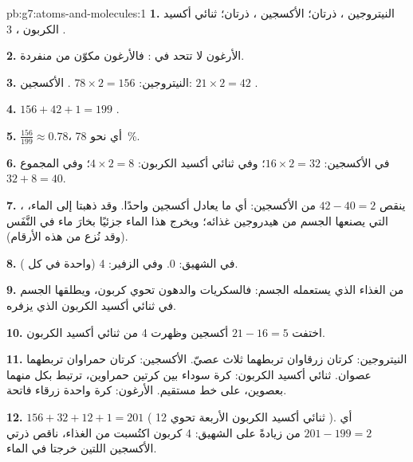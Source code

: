 \begin{solution}{pb:g7:atoms-and-molecules:1}
\textbf{1.} النيتروجين ، ذرتان؛ الأكسجين ، ذرتان؛ ثنائي
أكسيد الكربون ، 3 .

\textbf{2.}  الأرغون لا تتحد في : فالأرغون مكوّن من 
منفردة.

\textbf{3.} النيتروجين: $78 \times 2 = 156$ . الأكسجين: $21\times 2 =
42$ .

\textbf{4.} $156 + 42 + 1 = 199$ .

\textbf{5.} $\frac{156}{199} \approx 0.78$، أي نحو \qty{78}{\percent}.

\textbf{6.} في  الأكسجين: $16\times 2 = 32$؛ وفي  ثنائي أكسيد
الكربون: $4 \times 2 = 8$؛ وفي المجموع $32 + 8 = 40$.

\textbf{7.} ينقص $42 - 40 = 2$ من  الأكسجين: أي ما يعادل  أكسجين
واحدًا. وقد ذهبتا إلى  الماء، ، التي يصنعها الجسم من
هيدروجين غذائه؛ ويخرج هذا الماء جزئيًا بخارَ ماء في النَّفَس (وقد نُزع من
هذه الأرقام).

\textbf{8.} في الشهيق: 0. وفي الزفير: 4 (واحدة في كل ).

\textbf{9.} من الغذاء الذي يستعمله الجسم: فالسكريات والدهون تحوي 
كربون، ويطلقها الجسم في ثنائي أكسيد الكربون الذي يزفره.

\textbf{10.} اختفت $21 - 16 = 5$  أكسجين وظهرت 4  من ثنائي
أكسيد الكربون.

\textbf{11.} النيتروجين: كرتان زرقاوان تربطهما ثلاث عصيّ. الأكسجين:
كرتان حمراوان تربطهما عصوان. ثنائي أكسيد الكربون: كرة سوداء بين كرتين
حمراوين، ترتبط بكل منهما بعصوين، على خط مستقيم. الأرغون: كرة واحدة زرقاء
فاتحة.

\textbf{12.} $156 + 32 + 12 + 1 = 201$  ( ثنائي أكسيد الكربون
الأربعة تحوي 12 ). أي $201 - 199 = 2$ من  زيادةً على 
الشهيق: 4  كربون اكتُسبت من الغذاء، ناقص ذرتي الأكسجين اللتين خرجتا
في الماء.
\end{solution}
